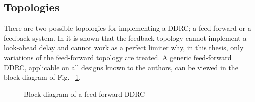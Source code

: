 \documentclass[../main2.tex]{subfiles}
\providecommand{\rootdir}{..}
\begin{document}
\subsection{Topologies}
There are two possible topologies for implementing a DDRC; a feed-forward or a feedback system. In \cite{reiss2012tutorial} it is shown that the feedback topology cannot implement a look-ahead delay and cannot work as a perfect limiter  why, in this thesis, only variations of the feed-forward topology are treated. A generic feed-forward DDRC, applicable on all designs known to the authors, can be viewed in the block diagram of Fig. ~\ref{fig:block_genericDDRC}. 
\begin{figure}[h]
\centerline{}
\caption{Block diagram of a feed-forward DDRC}
\label{fig:block_genericDDRC}
\end{figure}
\end{document}
